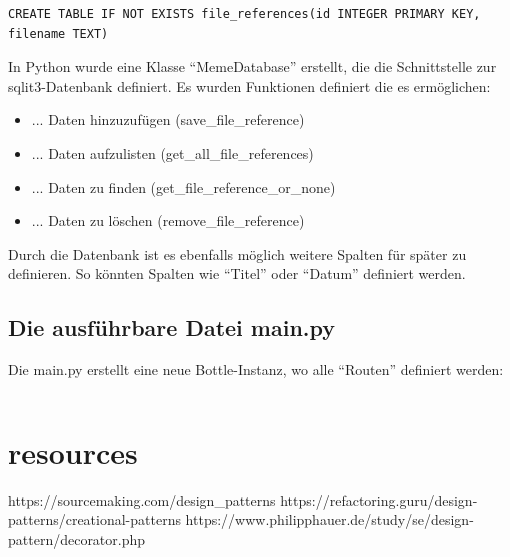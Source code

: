 \begin{lstlisting}[caption=Datenstruktur in SQL]
CREATE TABLE IF NOT EXISTS file_references(id INTEGER PRIMARY KEY, filename TEXT)
\end{lstlisting}

In Python wurde eine Klasse ``MemeDatabase'' erstellt, die die Schnittstelle zur sqlit3-Datenbank definiert. Es wurden Funktionen definiert die es ermöglichen:
\begin{itemize}
	\item ... Daten hinzuzufügen (save\_file\_reference)
	\item ... Daten aufzulisten (get\_all\_file\_references)
	\item ... Daten zu finden (get\_file\_reference\_or\_none)
	\item ... Daten zu löschen (remove\_file\_reference)
\end{itemize}

Durch die Datenbank ist es ebenfalls möglich weitere Spalten für später zu definieren. So könnten Spalten wie ``Titel'' oder ``Datum'' definiert werden. 

\subsection{Die ausführbare Datei main.py}
Die main.py erstellt eine neue Bottle-Instanz, wo alle ``Routen'' definiert werden:
\begin{lstlisting}[caption=Routen]

\end{lstlisting}






\clearpage
\section{resources}
https://sourcemaking.com/design\_patterns
https://refactoring.guru/design-patterns/creational-patterns
https://www.philipphauer.de/study/se/design-pattern/decorator.php
